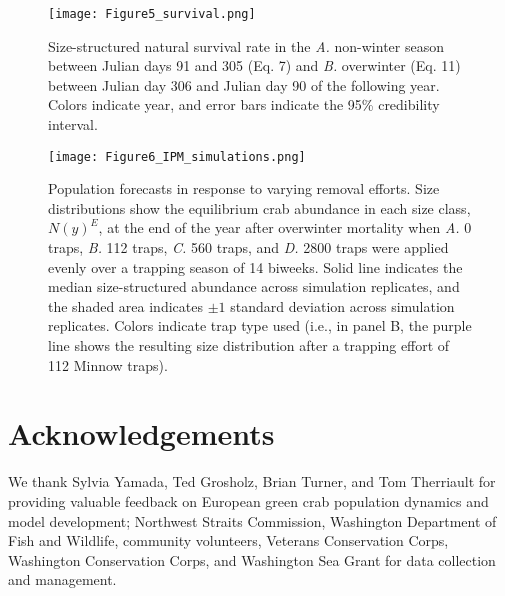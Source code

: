 \documentclass{article}
\begin{document}
\begin{figure}[H]
    \centering
    \texttt{[image: Figure5\_survival.png]}
    \caption{Size-structured natural survival rate in the \textit{A.} non-winter season between Julian days 91 and 305 (Eq. 7) and \textit{B.} overwinter (Eq. 11) between Julian day 306 and Julian day 90 of the following year. Colors indicate year, and error bars indicate the 95\% credibility interval.}
\end{figure}

\begin{figure}[H]
    \centering
    \texttt{[image: Figure6\_IPM\_simulations.png]}
    \caption{Population forecasts in response to varying removal efforts. Size distributions show the equilibrium crab abundance in each size class, $N(y)^E$, at the end of the year after overwinter mortality when \textit{A.} 0 traps, \textit{B.} 112 traps, \textit{C.} 560 traps, and \textit{D.} 2800 traps were applied evenly over a trapping season of 14 biweeks. Solid line indicates the median size-structured abundance across simulation replicates, and the shaded area indicates $\pm1$ standard deviation across simulation replicates. Colors indicate trap type used (i.e., in panel B, the purple line shows the resulting size distribution after a trapping effort of 112 Minnow traps).}
\end{figure}

\section{Acknowledgements}

We thank Sylvia Yamada, Ted Grosholz, Brian Turner, and Tom Therriault for providing valuable feedback on European green crab population dynamics and model development; Northwest Straits Commission, Washington Department of Fish and Wildlife, community volunteers, Veterans Conservation Corps, Washington Conservation Corps, and Washington Sea Grant for data collection and management.  

\printbibliography[]
\end{document}
